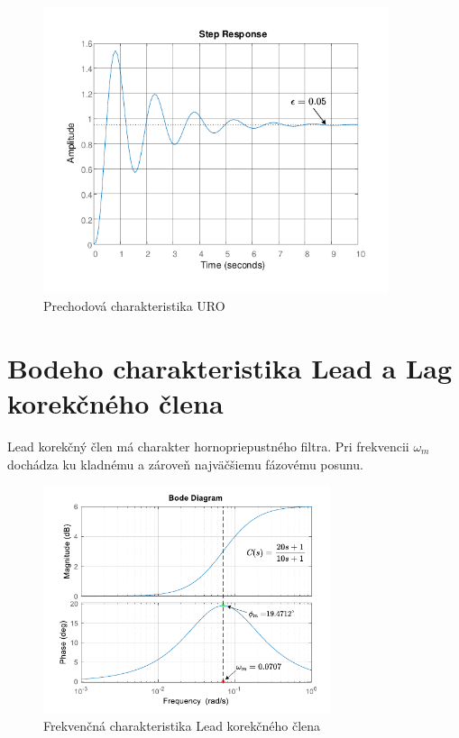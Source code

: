 \documentclass[a4paper,10pt]{article}
\begin{document}
\begin{figure}[ht]
\centering
\includegraphics[width=0.9\textwidth]{prechodova_charakteristika}
\caption{Prechodová charakteristika URO}
\end{figure}

\pagebreak

\section{Bodeho charakteristika Lead a Lag korekčného člena}
Lead korekčný člen má charakter hornopriepustného filtra. Pri frekvencii $\omega_m$ dochádza ku kladnému a zároveň najväčšiemu fázovému posunu.
\begin{figure}[ht]
\centering
\includegraphics[width=0.75\textwidth]{LeadBode}
\caption{Frekvenčná charakteristika Lead korekčného člena}
\end{figure}
\end{document}
